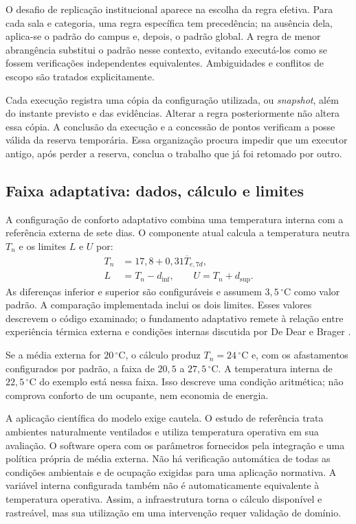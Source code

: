 \documentclass[tcc,capa]{texufpel}
\begin{document}
O desafio de replicação institucional aparece na escolha da regra efetiva. Para cada sala e categoria, uma regra específica tem precedência; na ausência dela, aplica-se o padrão do campus e, depois, o padrão global. A regra de menor abrangência substitui o padrão nesse contexto, evitando executá-los como se fossem verificações independentes equivalentes. Ambiguidades e conflitos de escopo são tratados explicitamente.

Cada execução registra uma cópia da configuração utilizada, ou \emph{snapshot}, além do instante previsto e das evidências. Alterar a regra posteriormente não altera essa cópia. A conclusão da execução e a concessão de pontos verificam a posse válida da reserva temporária. Essa organização procura impedir que um executor antigo, após perder a reserva, conclua o trabalho que já foi retomado por outro.

\subsection{Faixa adaptativa: dados, cálculo e limites}\label{sec:conforto}
A configuração de conforto adaptativo combina uma temperatura interna com a referência externa de sete dias. O componente atual calcula a temperatura neutra $T_n$ e os limites $L$ e $U$ por:
\begin{align}
T_n &=17{,}8+0{,}31\overline{T}_{e,7d},\\
L &=T_n-d_{\mathrm{inf}},\qquad U=T_n+d_{\mathrm{sup}}.
\end{align}
As diferenças inferior e superior são configuráveis e assumem $3{,}5\,^{\circ}\mathrm{C}$ como valor padrão. A comparação implementada inclui os dois limites. Esses valores descrevem o código examinado; o fundamento adaptativo remete à relação entre experiência térmica externa e condições internas discutida por De Dear e Brager \cite{deDear2002}.

Se a média externa for $20\,^{\circ}\mathrm{C}$, o cálculo produz $T_n=24\,^{\circ}\mathrm{C}$ e, com os afastamentos configurados por padrão, a faixa de $20{,}5$ a $27{,}5\,^{\circ}\mathrm{C}$. A temperatura interna de $22{,}5\,^{\circ}\mathrm{C}$ do exemplo está nessa faixa. Isso descreve uma condição aritmética; não comprova conforto de um ocupante, nem economia de energia.

A aplicação científica do modelo exige cautela. O estudo de referência trata ambientes naturalmente ventilados e utiliza temperatura operativa em sua avaliação. O software opera com os parâmetros fornecidos pela integração e uma política própria de média externa. Não há verificação automática de todas as condições ambientais e de ocupação exigidas para uma aplicação normativa. A variável interna configurada também não é automaticamente equivalente à temperatura operativa. Assim, a infraestrutura torna o cálculo disponível e rastreável, mas sua utilização em uma intervenção requer validação de domínio.
\end{document}
